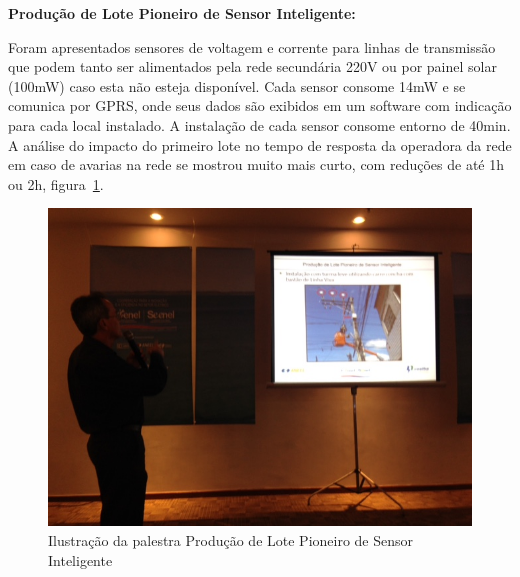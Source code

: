 
\textbf{Produção de Lote Pioneiro de Sensor Inteligente:}

Foram apresentados sensores de voltagem e corrente para linhas de transmissão
que podem tanto ser alimentados pela rede secundária 220V ou por painel solar
(100mW) caso esta não esteja disponível. Cada sensor consome 14mW e se comunica
por GPRS, onde seus dados são exibidos em um software com indicação para cada
local instalado.
A instalação de cada sensor consome entorno de 40min. A análise do impacto do
primeiro lote no tempo de resposta da operadora da rede em caso de avarias na
rede se mostrou muito mais curto, com reduções de até 1h ou 2h,
figura~\ref{fig::bebado}.

\begin{figure}[h!]	
	\includegraphics[width=\columnwidth]{figs/bebado.JPG}
	\caption{Ilustração da palestra Produção de Lote Pioneiro de Sensor Inteligente}
	\label{fig::bebado}
\end{figure}